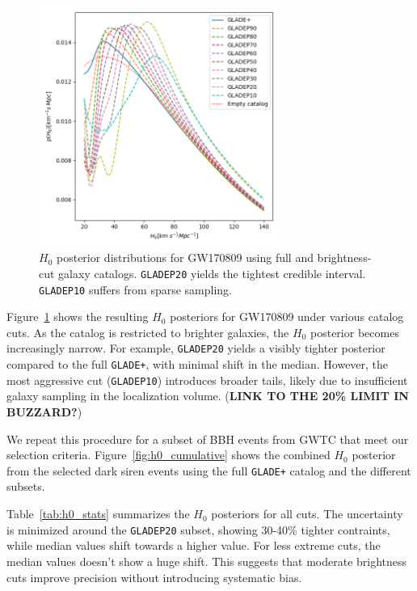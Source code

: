 \begin{figure}[h!]
  \centering
  \includegraphics[width=0.7\textwidth]{figures/GW170809_H0.png}
  \caption[$H_0$ posterior distributions for GW170809 using full and brightness-cut galaxy catalogs.]{$H_0$ posterior distributions for GW170809 using full and brightness-cut galaxy catalogs. \texttt{GLADEP20} yields the tightest credible interval. \texttt{GLADEP10} suffers from sparse sampling.}
  \label{fig:h0_gw170809}
\end{figure}

Figure~\ref{fig:h0_gw170809} shows the resulting $H_0$ posteriors for GW170809 under various catalog cuts. As the catalog is restricted to brighter galaxies, the $H_0$ posterior becomes increasingly narrow. For example, \texttt{GLADEP20} yields a visibly tighter posterior compared to the full \texttt{GLADE+}, with minimal shift in the median. However, the most aggressive cut (\texttt{GLADEP10}) introduces broader tails, likely due to insufficient galaxy sampling in the localization volume. (\textbf{LINK TO THE 20\% LIMIT IN BUZZARD?})

We repeat this procedure for a subset of \ac{BBH} events from \ac{GWTC} that meet our selection criteria. Figure~\ref{fig:h0_cumulative} shows the combined $H_0$ posterior from the selected dark siren events using the full \texttt{GLADE+} catalog and the different subsets.

Table~\ref{tab:h0_stats} summarizes the $H_0$ posteriors for all cuts. The uncertainty is minimized around the \texttt{GLADEP20} subset, showing 30-40\% tighter contraints, while median values shift towards a higher value. For less extreme cuts, the median values doesn't show a huge shift. This suggests that moderate brightness cuts improve precision without introducing systematic bias.

